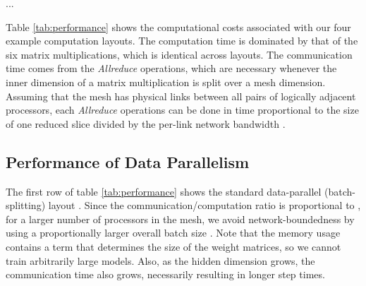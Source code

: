 \documentclass{article}
\begin{document}
\begin{itemize}
\begin{algorithm}[h!]
\begin{algorithmic}[1]
\def \X {X^{\Xshape}}
\def \XT {{X^T}^{\XTshape}}
\def \G {G^{\Hshape}}
\def \H {H^{\Hshape}}
\def \HT {{H^T}^{\HTshape}}
\def \Y {Y^{\Yshape}}
\def \Wone {W_1^{\Woneshape}}
\def \Wtwo {W_2^{\Wtwoshape}}
\def \WoneT {{W_1^T}^{\WoneTshape}}
\def \WtwoT {{W_2^T}^{\WtwoTshape}}

\State  \Comment{}
\State 
\State  \Comment{}
\State ...
\State  \Comment{}
\State  
\State  \Comment{}
\State  \Comment{}
\State  \Comment{}
\end{algorithmic}
\end{algorithm}

\def \DXY {d_{xy}}
\def \COMP {6\gamma b \DXY d_h}

\begin{table}[h!] \label{tab:performance}
\caption{Computation, communication and memory costs for four layouts of the computation in Algorithm 1.
 represents the time per FLOP on one processor and  represents the time per transmitted value on one link.  Computation costs omit lower-order terms.  Memory costs are approximate and omit constant factors.  To save space, we define .}
\label{tab:performance}
\end{table}

Table \ref{tab:performance} shows the computational costs associated with our four example computation layouts.  The computation time is dominated by that of the six matrix multiplications, which is identical across layouts.  The communication time comes from the \textit{Allreduce} operations, which are necessary whenever the inner dimension of a matrix multiplication is split over a mesh dimension.  Assuming that the mesh has physical links between all pairs of logically adjacent processors, each \textit{Allreduce} operations can be done in time proportional to the size of one reduced slice divided by the per-link network bandwidth \cite{Jain10y.:optimal}.

\subsection{Performance of Data Parallelism}
The first row of table \ref{tab:performance} shows the standard data-parallel (batch-splitting) layout .  Since the communication/computation ratio is proportional to  , for a larger number of processors  in the mesh, we avoid network-boundedness by using a proportionally larger overall batch size .   Note that the memory usage contains a term  that determines the size of the weight matrices, so we cannot train arbitrarily large models.   Also, as the hidden dimension grows, the communication time also grows, necessarily resulting in longer step times.


\end{itemize}
\end{document}
